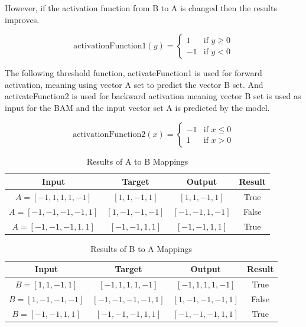 \documentclass[12pt]{article}
\begin{document}
However, if the activation function from B to A is changed then the results improves. 

\[
\text{activationFunction1}(y) = 
\begin{cases} 
1 & \text{if } y \geq 0 \\ 
-1 & \text{if } y < 0 
\end{cases}
\]

The following threshold function, activateFunction1 is used for forward activation, meaning using vector A set to predict the vector B set. And activateFunction2 is used for backward activation meaning vector B set is used as input for the BAM and the input vector set A is predicted by the model.

\[
\text{activationFunction2}(x) = 
\begin{cases} 
-1 & \text{if } x \leq 0 \\ 
1 & \text{if } x > 0 
\end{cases}
\]

\begin{table}[ht]
    \centering
    \caption{Results of A to B Mappings}
    \begin{tabular}{|c|c|c|c|}
        \hline
        \textbf{Input} & \textbf{Target} & \textbf{Output} & \textbf{Result} \\ \hline
        $A = [-1, 1, 1, 1, -1]$ & $[1, 1, -1, 1]$ & $[1, 1, -1, 1]$ & True \\ \hline
        $A = [-1, -1, -1, -1, 1]$ & $[1, -1, -1, -1]$ & $[-1, -1, 1, -1]$ & False \\ \hline
        $A = [-1, -1, -1, 1, 1]$ & $[-1, -1, 1, 1]$ & $[-1, -1, 1, 1]$ & True \\ \hline
    \end{tabular}
\end{table}

\begin{table}[ht]
    \centering
    \caption{Results of B to A Mappings}
    \begin{tabular}{|c|c|c|c|}
        \hline
        \textbf{Input} & \textbf{Target} & \textbf{Output} & \textbf{Result} \\ \hline
        $B = [1, 1, -1, 1]$ & $[-1, 1, 1, 1, -1]$ & $[-1, 1, 1, 1, -1]$ & True \\ \hline
        $B = [1, -1, -1, -1]$ & $[-1, -1, -1, -1, 1]$ & $[1, -1, -1, -1, 1]$ & False \\ \hline
        $B = [-1, -1, 1, 1]$ & $[-1, -1, -1, 1, 1]$ & $[-1, -1, -1, 1, 1]$ & True \\ \hline
    \end{tabular}
\end{table}
\end{document}
